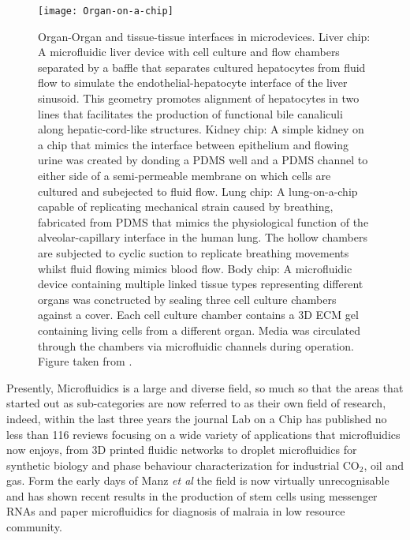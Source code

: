 \begin{figure}
  \begin{center}
  \texttt{[image: Organ-on-a-chip]}
  \end{center}
  \caption{Organ-Organ and tissue-tissue interfaces in microdevices. Liver chip: A microfluidic liver device with cell culture and flow chambers separated by
  a baffle that separates cultured hepatocytes from fluid flow to simulate the endothelial-hepatocyte interface of the liver sinusoid. This geometry promotes alignment
  of hepatocytes in two lines that facilitates the production of functional bile canaliculi along hepatic-cord-like structures\citep{nakao2011bile}. Kidney chip:
  A simple kidney on a chip that mimics the interface between epithelium and flowing urine was created by donding a PDMS well and a PDMS channel to either side
  of a semi-permeable membrane on which cells are cultured and subejected to fluid flow\citep{jang2010multi}. Lung chip: A lung-on-a-chip capable of replicating mechanical
  strain caused by breathing, fabricated from PDMS that mimics the physiological function of the alveolar-capillary interface in the human lung. The hollow chambers
  are subjected to cyclic suction to replicate breathing movements whilst fluid flowing mimics blood flow\citep{huh2010reconstituting}. Body chip: A
  microfluidic device containing multiple linked tissue types representing different organs was conctructed by sealing three cell culture chambers against a cover. Each
  cell culture chamber contains a 3D ECM gel containing living cells from a different organ. Media was circulated through the chambers via microfluidic channels
  during operation\citep{sung2009micro}. Figure taken from \citep{huh2012microengineered}.}
  \label{fig:OrganChip}
\end{figure}



Presently, Microfluidics is a large and diverse field, so much so that the areas that started out as sub-categories are now referred to as their
own field of research, indeed, within the last three years the journal Lab on a Chip has published no less than 116 reviews focusing on a wide variety of applications
that microfluidics now enjoys, from 3D printed fluidic networks\citep{kinstlinger20163d} to droplet microfluidics for synthetic biology\citep{gach2017droplet} and
phase behaviour characterization for industrial CO$_2$, oil and gas\citep{bao2017microfluidic}. Form the early days of Manz \textit{et al} the field is
now virtually unrecognisable and has shown recent results in the production of stem cells using messenger RNAs\citep{giulitti2019direct} and paper microfluidics for diagnosis of malraia in
low resource community\citep{reboud2019based}.


